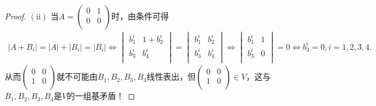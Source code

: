 \documentclass[../../main.tex]{subfiles}%
\begin{document}
\begin{proof}
$\left( \mathrm{ii} \right)$ 当$A=\begin{pmatrix}
0&		1\\
0&		0\\
\end{pmatrix}$时，由条件可得
\begin{align*}
\left| A+B_i \right|=\left| A \right|+\left| B_i \right|=\left| B_i \right|\Longleftrightarrow \begin{vmatrix}
b_{1}^{i}&		1+b_{2}^{i}\\
b_{3}^{i}&		b_{4}^{i}\\
\end{vmatrix}=\begin{vmatrix}
b_{1}^{i}&		b_{2}^{i}\\
b_{3}^{i}&		b_{4}^{i}\\
\end{vmatrix}
\Longleftrightarrow \begin{vmatrix}
b_{1}^{i}&		1\\
b_{3}^{i}&		0\\
\end{vmatrix}=0\Longleftrightarrow b_{3}^{i}=0,i=1,2,3,4.
\end{align*}
从而$\begin{pmatrix}
0&		0\\
1&		0\\
\end{pmatrix}$就不可能由$B_1,B_2,B_3,B_4$线性表出，但$\begin{pmatrix}
0&		0\\
1&		0\\
\end{pmatrix} \in V$，这与$B_1,B_2,B_3,B_4$是$V$的一组基矛盾！
\end{proof}
\end{document}

